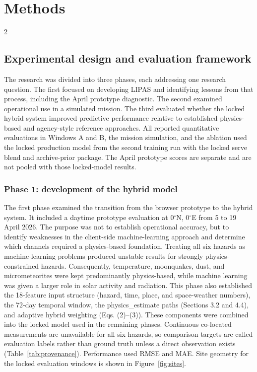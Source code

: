 \section{Methods}
\begin{multicols}{2}

\subsection{Experimental design and evaluation framework}

The research was divided into three phases, each addressing one research question. The first focused on developing LIPAS and identifying lessons from that process, including the April prototype diagnostic. The second examined operational use in a simulated mission. The third evaluated whether the locked hybrid system improved predictive performance relative to established physics-based and agency-style reference approaches. All reported quantitative evaluations in Windows A and B, the mission simulation, and the ablation used the locked production model from the second training run with the locked serve blend and archive-prior package. The April prototype scores are separate and are not pooled with those locked-model results.

\subsubsection{Phase 1: development of the hybrid model}

The first phase examined the transition from the browser prototype to the hybrid system. It included a daytime prototype evaluation at 0$^\circ$N, 0$^\circ$E from 5 to 19 April 2026. The purpose was not to establish operational accuracy, but to identify weaknesses in the client-side machine-learning approach and determine which channels required a physics-based foundation. Treating all six hazards as machine-learning problems produced unstable results for strongly physics-constrained hazards. Consequently, temperature, moonquakes, dust, and micrometeorites were kept predominantly physics-based, while machine learning was given a larger role in solar activity and radiation. This phase also established the 18-feature input structure (hazard, time, place, and space-weather numbers), the 72-day temporal window, the physics\_estimate paths (Sections 3.2 and 4.4), and adaptive hybrid weighting (Eqs. (2)--(3)). These components were combined into the locked model used in the remaining phases. Continuous co-located measurements are unavailable for all six hazards, so comparison targets are called evaluation labels rather than ground truth unless a direct observation exists (Table~\ref{tab:provenance}). Performance used RMSE and MAE. Site geometry for the locked evaluation windows is shown in Figure~\ref{fig:sites}.


\end{multicols}
